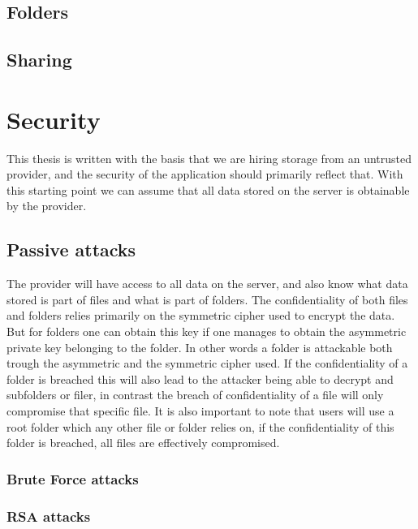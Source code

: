 \documentclass[pdftex,english,10pt,b5paper,twoside]{book}
\begin{document}
\subsection{Folders}

\subsection{Sharing}

\section{Security}
This thesis is written with the basis that we are hiring storage from an
untrusted provider, and the security of the application should primarily
reflect that. With this starting point we can assume that all data stored on
the server is obtainable by the provider.

\subsection{Passive attacks}
The provider will have access to all data on the server, and also know what
data stored is part of files and what is part of folders. The confidentiality
of both files and folders relies primarily on the symmetric cipher used to
encrypt the data. But for folders one can obtain this key if one manages to
obtain the asymmetric private key belonging to the folder. In other words a
folder is attackable both trough the asymmetric and the symmetric cipher used.
If the confidentiality of a folder is breached this will also lead to the
attacker being able to decrypt and subfolders or filer, in contrast the breach
of confidentiality of a file will only compromise that specific file. It is
also important to note that users will use a root folder which any other file
or folder relies on, if the confidentiality of this folder is breached, all
files are effectively compromised.

\subsubsection{Brute Force attacks}
\subsubsection{RSA attacks}
\end{document}
